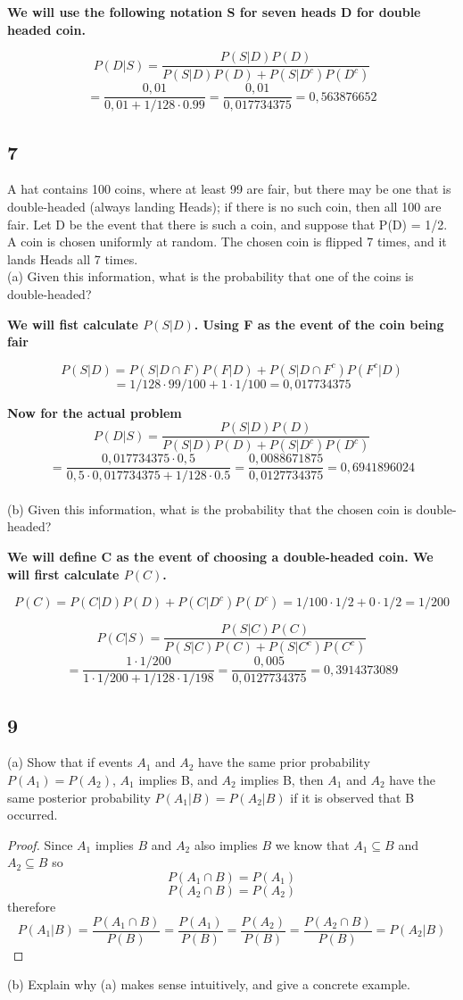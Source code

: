 \documentclass{article}
\begin{document}
\textbf{We will use the following notation S for seven heads D for double headed coin.}

$$P(D|S)=\frac{P(S|D)P(D)}{P(S|D)P(D)+P(S|D^c)P(D^c)}$$
$$=\frac{0,01}{0,01+1/128 \cdot 0.99}=\frac{0,01}{0,017734375}=0,563876652$$

\subsection{7}A hat contains 100 coins, where at least 99 are fair, but there may be one that is double-headed (always landing Heads); if there is no such coin, then all 100 are fair. Let D be the event that there is such a coin, and suppose that P(D) = 1/2. A coin is chosen uniformly at random. The chosen coin is flipped 7 times, and it lands Heads all 7 times.\\
(a) Given this information, what is the probability that one of the coins is double-headed?

\textbf{We will fist calculate $P(S|D)$. Using F as the event of the coin being fair}

$$P(S|D)=P(S|D \cap F)P(F|D)+P(S|D \cap F^c)P(F^c|D)$$
$$=1/128 \cdot 99/100 + 1 \cdot 1/100=0,017734375$$

\textbf{Now for the actual problem}
$$P(D|S)=\frac{P(S|D)P(D)}{P(S|D)P(D)+P(S|D^c)P(D^c)}$$
$$=\frac{0,017734375 \cdot 0,5}{0,5 \cdot 0,017734375 +1/128 \cdot 0.5}=\frac{0,0088671875}{0,0127734375}=0,6941896024$$\\
(b) Given this information, what is the probability that the chosen coin is double-headed?

\textbf{We will define C as the event of choosing a double-headed coin. We will first calculate $P(C)$.}

$$P(C)=P(C|D)P(D)+P(C|D^c)P(D^c)=1/100 \cdot 1/2 + 0 \cdot 1/2=1/200$$

$$P(C|S)=\frac{P(S|C)P(C)}{P(S|C)P(C)+P(S|C^c)P(C^c)}$$
$$=\frac{1 \cdot 1/200}{1 \cdot 1/200 +1/128 \cdot 1/198}=\frac{0,005}{0,0127734375}=0,3914373089$$
\newpage
\subsection{9}
(a) Show that if events $A_1$ and $A_2$ have the same prior probability $P (A_1 ) = P (A_2 )$, $A_1$ implies B, and $A_2$ implies B, then $A_1$ and $A_2$ have the same posterior probability $P(A_1|B) = P(A_2|B)$ if it is observed that B occurred.

\begin{proof}
    Since $A_1$ implies $B$ and $A_2$ also implies $B$ we know that $A_1 \subseteq B$ and $A_2 \subseteq B$ so $$P(A_1 \cap B)= P(A_1)$$
    $$P(A_2 \cap B)= P(A_2)$$ therefore
    $$P(A_1|B)=\frac{P(A_1 \cap B)}{P(B)}=\frac{P(A_1)}{P(B)}=\frac{P(A_2)}{P(B)}=\frac{P(A_2 \cap B)}{P(B)}=P(A_2|B)$$
    
\end{proof} 
(b) Explain why (a) makes sense intuitively, and give a concrete example.
\end{document}

